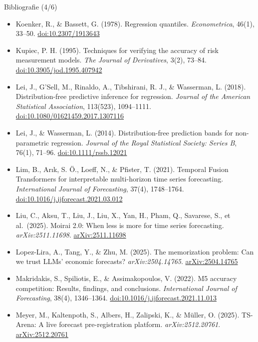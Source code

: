 \begin{frame}{Bibliografie (4/6)}
\itemsize{\tiny}
\begin{itemize}
    \item Koenker, R., \& Bassett, G. (1978). Regression quantiles. \textit{Econometrica}, 46(1), 33--50. \href{https://doi.org/10.2307/1913643}{doi:10.2307/1913643}
    \item Kupiec, P. H. (1995). Techniques for verifying the accuracy of risk measurement models. \textit{The Journal of Derivatives}, 3(2), 73--84. \href{https://doi.org/10.3905/jod.1995.407942}{doi:10.3905/jod.1995.407942}
    \item Lei, J., G'Sell, M., Rinaldo, A., Tibshirani, R. J., \& Wasserman, L. (2018). Distribution-free predictive inference for regression. \textit{Journal of the American Statistical Association}, 113(523), 1094--1111. \href{https://doi.org/10.1080/01621459.2017.1307116}{doi:10.1080/01621459.2017.1307116}
    \item Lei, J., \& Wasserman, L. (2014). Distribution-free prediction bands for non-parametric regression. \textit{Journal of the Royal Statistical Society: Series B}, 76(1), 71--96. \href{https://doi.org/10.1111/rssb.12021}{doi:10.1111/rssb.12021}
    \item Lim, B., Arık, S. Ö., Loeff, N., \& Pfister, T. (2021). Temporal Fusion Transformers for interpretable multi-horizon time series forecasting. \textit{International Journal of Forecasting}, 37(4), 1748--1764. \href{https://doi.org/10.1016/j.ijforecast.2021.03.012}{doi:10.1016/j.ijforecast.2021.03.012}
    \item Liu, C., Aksu, T., Liu, J., Liu, X., Yan, H., Pham, Q., Savarese, S., et al.\ (2025). Moirai 2.0: When less is more for time series forecasting. \textit{arXiv:2511.11698}. \href{https://arxiv.org/abs/2511.11698}{arXiv:2511.11698}
    \item Lopez-Lira, A., Tang, Y., \& Zhu, M. (2025). The memorization problem: Can we trust LLMs' economic forecasts? \textit{arXiv:2504.14765}. \href{https://arxiv.org/abs/2504.14765}{arXiv:2504.14765}
    \item Makridakis, S., Spiliotis, E., \& Assimakopoulos, V. (2022). M5 accuracy competition: Results, findings, and conclusions. \textit{International Journal of Forecasting}, 38(4), 1346--1364. \href{https://doi.org/10.1016/j.ijforecast.2021.11.013}{doi:10.1016/j.ijforecast.2021.11.013}
    \item Meyer, M., Kaltenpoth, S., Albers, H., Zalipski, K., \& Müller, O. (2025). TS-Arena: A live forecast pre-registration platform. \textit{arXiv:2512.20761}. \href{https://arxiv.org/abs/2512.20761}{arXiv:2512.20761}

\end{itemize}
\end{frame}
